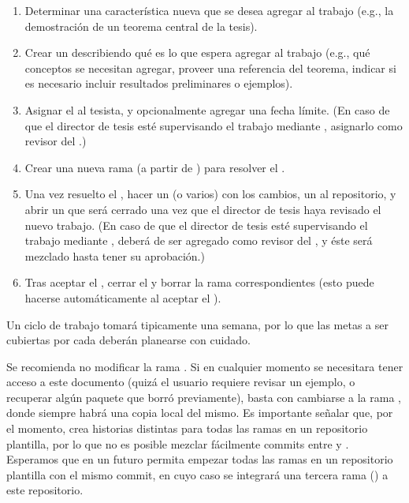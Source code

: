 \begin{enumerate}
  \item Determinar una caracter\'istica nueva que se desea agregar al
    trabajo (e.g., la demostraci\'on de un teorema central de la tesis).

  \item Crear un  describiendo qu\'e es lo que espera agregar
    al trabajo (e.g., qu\'e conceptos se necesitan agregar, proveer una
    referencia del teorema, indicar si es necesario incluir resultados
    preliminares o ejemplos).

  \item Asignar el  al tesista, y opcionalmente agregar una fecha
    l\'imite.   (En caso de que el director de tesis est\'e supervisando el
    trabajo mediante , asignarlo como revisor del .)

  \item Crear una nueva rama (a partir de ) para resolver el
    .

  \item Una vez resuelto el , hacer un  (o varios) con
    los cambios, un  al repositorio, y abrir un 
    que ser\'a cerrado una vez que el director de tesis haya revisado el nuevo
    trabajo. (En caso de que el director de tesis est\'e supervisando el
    trabajo mediante , deber\'a de ser agregado como revisor del
    , y \'este ser\'a mezclado hasta tener su aprobaci\'on.)

  \item Tras aceptar el , cerrar el  y borrar la
    rama correspondientes (esto puede hacerse autom\'aticamente al aceptar el
    ).
\end{enumerate}

Un ciclo de trabajo tomar\'a tipicamente una semana, por lo que las metas a ser
cubiertas por cada  deber\'an planearse con cuidado.

Se recomienda no modificar la rama .   Si en cualquier momento se
necesitara tener acceso a este documento (quiz\'a el usuario requiere revisar un
ejemplo, o recuperar alg\'un paquete que borr\'o previamente), basta con
cambiarse a la rama , donde siempre habr\'a una copia local del
mismo.   Es importante se\~nalar que, por el momento,  crea
historias distintas para todas las ramas en un repositorio plantilla, por lo que
no es posible mezclar f\'acilmente commits entre  y .
Esperamos que en un futuro  permita empezar todas las ramas en un
repositorio plantilla con el mismo commit, en cuyo caso se integrar\'a una
tercera rama () a este repositorio.
